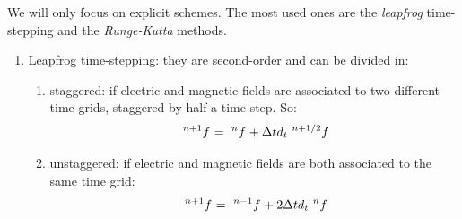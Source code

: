 We will only focus on explicit schemes. The most used ones are the
\emph{leapfrog} time-stepping and the \emph{Runge-Kutta} methods.
\begin{enumerate}
\item
  Leapfrog time-stepping: they are second-order and can be divided in:
  \begin{enumerate}
  \item
    staggered: if electric and magnetic fields are associated to two
    different time grids, staggered by half a time-step. So:
    \begin{equation} \label{eqn:lf1}
      \Disc{f}{}{n+1} = \Disc{f}{}{n} + \deltat d_t \Disc{f}{}{n+1/2}
    \end{equation}
    
    
  \item
    unstaggered: if electric and magnetic fields are both associated
    to the same time grid:
    \begin{equation} \label{eqn:lf2}
      \Disc{f}{}{n+1} = \Disc{f}{}{n-1} + 2\deltat d_t \Disc{f}{}{n}
    \end{equation}
    
    

\end{enumerate}
\end{enumerate}
